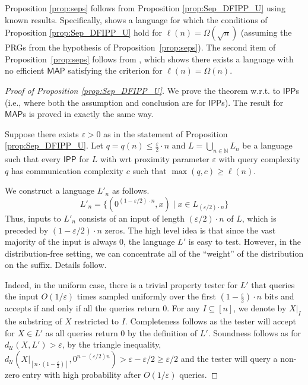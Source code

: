 \documentclass[10pt,a4paper]{article}
\newcommand{\IPP}{\mathsf{IPP}}
\newcommand{\MAP}{\mathsf{MAP}}
\newcommand{\sU}{\mathcal{U}}
\begin{document}
Proposition \ref{prop:seps} follows from Proposition \ref{prop:Sep_DFIPP_U} using known results. Specifically, \cite[Theorem 4]{KR15} shows a language for which the conditions of Proposition \ref{prop:Sep_DFIPP_U} hold for $\ell(n)=\Omega(\sqrt{n})$ (assuming the PRGs from the hypothesis of Proposition~\ref{prop:seps}). The second item of Proposition~\ref{prop:seps} follows from  \cite[Theorem 4]{GR18}, which shows there exists a language with no efficient $\MAP$ satisfying the criterion for $\ell(n)=\Omega(n)$. 

\begin{proof}[Proof of Proposition \ref{prop:Sep_DFIPP_U}]
    We prove the theorem w.r.t. to $\IPP$s (i.e., where both the assumption and conclusion are for $\IPP$s). The result for $\MAP$s is proved in exactly the same way.

    Suppose there exists $\varepsilon>0$ as in the statement of Proposition \ref{prop:Sep_DFIPP_U}. Let $q=q(n) \leq \frac{\varepsilon}{2}\cdot n$ and $L=\bigcup_{n\in\mathbb{N}} L_{n}$ be a language such that every $\IPP$ for $L$ with wrt proximity parameter $\varepsilon$ with query complexity $q$ has communication complexity $c$ such that $\max(q,c) \geq \ell(n)$. 
    
  
    We construct a language $L'_{n}$ as follows.
    \begin{equation*}
        L'_{n}= \big\{(0^{(1-\varepsilon/2) \cdot n},x) \;\vert\; x\in L_{(\varepsilon/2) \cdot n} \big\}
    \end{equation*}
    Thus, inputs to $L'_n$ consists of an input of length $(\varepsilon/2) \cdot n$ of $L$, which is preceded by $(1-\varepsilon/2) \cdot n$ zeros. The high level idea is that since the vast majority of the input is always $0$, the language $L'$ is easy to test. However, in the distribution-free setting, we can concentrate all of the ``weight'' of the distribution on the suffix. Details follow.

    Indeed, in the uniform case, there is a trivial property tester for $L'$ that queries the input $O(1/\varepsilon)$ times sampled uniformly over the first $\left(1-\frac{\varepsilon}{2}\right) \cdot n$ bits and accepts if and only if all the queries return $0$.
    For any $I\subseteq [n]$, we denote by $X\vert_{I}$ the substring of $X$ restricted to $I$.  Completeness follows as the tester will accept for $X\in L'$ as all queries return $0$ by the definition of $L'$. Soundness follows as for $d_{\sU}(X,L')>\varepsilon$, by the triangle inequality, $d_{\sU}(X\vert_{\left[n\cdot\left(1-\frac{\varepsilon}{2}\right)\right]},0^{n-(\varepsilon/2)n})>\varepsilon-\varepsilon/2\geq\varepsilon/2$ and the tester will query a non-zero entry with high probability after $O(1/\varepsilon)$ queries.


\end{proof}
\end{document}
